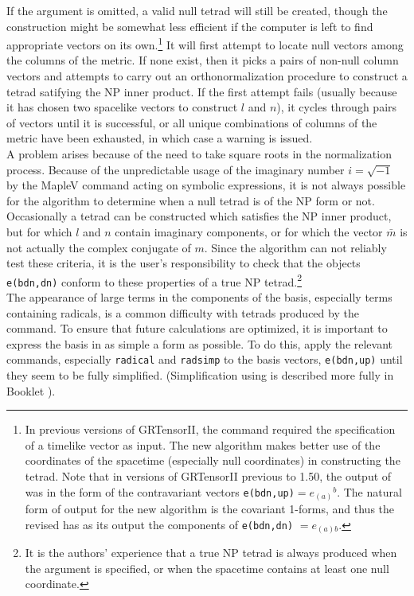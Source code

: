 \documentclass{article}
\begin{document}
If the argument is omitted, a valid null tetrad will still be created,
though the construction might be somewhat less efficient if the
computer is left to find appropriate vectors on its own.\footnote{In
previous versions of GRTensorII, the  command required
the specification of a timelike vector as input. The new algorithm
makes better use of the coordinates of the spacetime (especially null
coordinates) in constructing the tetrad. Note that in versions of
GRTensorII previous to 1.50, the output of  was in the
form of the contravariant vectors
\texttt{e(bdn,up)}$=e_{(a)}{}^b$. The natural form of output for the
new algorithm is the covariant 1-forms, and thus the revised
 has as its output the components of
\texttt{e(bdn,dn)} $= e_{(a)b}$.}  It will first attempt to locate
null vectors among the columns of the metric. If none exist, then it
picks a pairs of non-null column vectors and attempts to carry out an
orthonormalization procedure to construct a tetrad satifying the NP
inner product. If the first attempt fails (usually because it has
chosen two spacelike vectors to construct $l$ and $n$), it cycles
through pairs of vectors until it is successful, or all unique
combinations of columns of the metric have been exhausted, in which
case a warning is issued.\\

A problem arises because of the need to take square roots in the
normalization process. Because of the unpredictable usage of the
imaginary number $i=\sqrt{-1}$ by the MapleV  command
acting on symbolic expressions, it is not always possible for the
algorithm to determine when a null tetrad is of the NP form or
not. Occasionally a tetrad can be constructed which satisfies the NP
inner product, but for which $l$ and $n$ contain imaginary components,
or for which the vector $\bar{m}$ is not actually the complex
conjugate of $m$.  Since the algorithm can not reliably test these
criteria, it is the user's responsibility to check that the objects
\texttt{e(bdn,dn)} conform to these properties of a true NP
tetrad.\footnote{It is the authors' experience that a true NP tetrad
is always produced when the  argument is specified,
or when the spacetime contains at least one null coordinate.}\\

The appearance of large terms in the components of the basis,
especially terms containing radicals, is a common difficulty with
tetrads produced by the  command. To ensure that
future calculations are optimized, it is important to express the
basis in as simple a form as possible. To do this, apply the relevant
 commands, especially \texttt{radical} and
\texttt{radsimp} to the basis vectors, \texttt{e(bdn,up)} until they
seem to be fully simplified. (Simplification using  is
described more fully in Booklet \grCalcRef).\\
\end{document}

